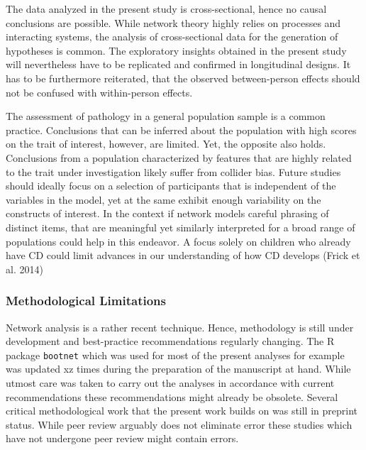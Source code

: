 The data analyzed in the present study is cross-sectional, hence no causal conclusions are possible. 
While network theory highly relies on processes and interacting systems, the analysis of cross-sectional data for the generation of hypotheses is common. 
The exploratory insights obtained in the present study will nevertheless have to be replicated and confirmed in longitudinal designs.
It has to be furthermore reiterated, that the observed between-person effects should not be confused with within-person effects.

The assessment of pathology in a general population sample is a common practice. 
Conclusions that can be inferred about the population with high scores on the trait of interest, however, are limited.
Yet, the opposite also holds. Conclusions from a population characterized by features that are highly related to the trait under investigation likely suffer from collider bias. 
Future studies should ideally focus on a selection of participants that is independent of the variables in the model, yet at the same exhibit enough variability on the constructs of interest. 
In the context if network models careful phrasing of distinct items, that are meaningful yet similarly interpreted for a broad range of populations could help in this endeavor.
A focus solely on children who already have CD could limit advances in our understanding of how CD develops (Frick et al. 2014) \parencite{frick_can_2014}

\subsubsection{Methodological Limitations}
 
 Network analysis is a rather recent technique. 
 Hence, methodology is still under development and best-practice recommendations regularly changing.
 The R package \texttt{bootnet} which was used for most of the present analyses for example was updated xz times
 during the preparation of the manuscript at hand. 
 While utmost care was taken to carry out the analyses in accordance with current recommendations these 
 recommendations might already be obsolete. Several critical methodological work that the present work builds 
 on was still in preprint status. While peer review arguably does not eliminate error these studies which have not undergone peer review might contain errors.
 
